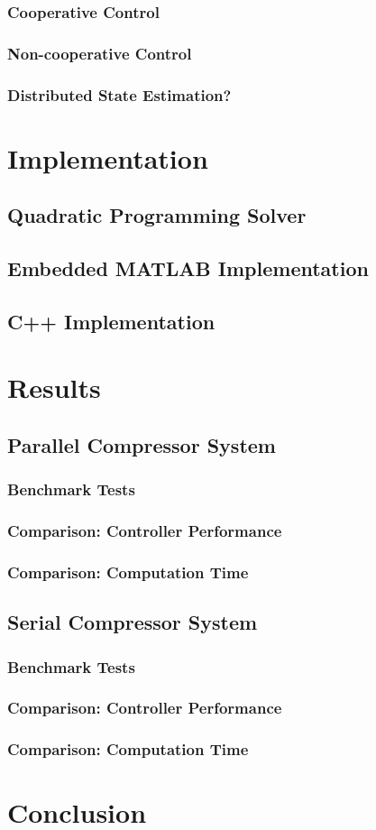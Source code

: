 \documentclass[doubleheaders,titlepage,oneside,openright,12pt]{epflthesis}
\numberwithin{equation}{chapter}
\begin{document}
\subsection{Cooperative Control}
\subsection{Non-cooperative Control}
\subsection{Distributed State Estimation?}

\chapter{Implementation}
\section{Quadratic Programming Solver}
\section{Embedded MATLAB Implementation}
\section{C++ Implementation}

\chapter{Results}
\section{Parallel Compressor System}
\subsection{Benchmark Tests}
\subsection{Comparison: Controller Performance}
\subsection{Comparison: Computation Time}
\section{Serial Compressor System}
\subsection{Benchmark Tests}
\subsection{Comparison: Controller Performance}
\subsection{Comparison: Computation Time}



\chapter{Conclusion}
\end{document}
